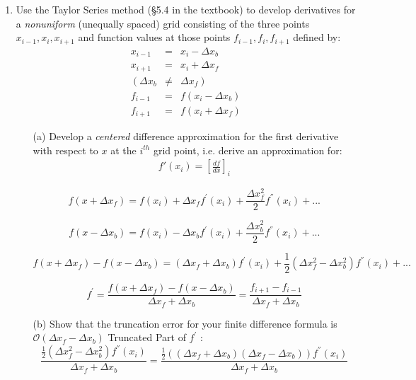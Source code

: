 \documentclass{article}
\begin{document}
\begin{enumerate}
  \item Use the Taylor Series method (\S 5.4 in the textbook) to develop derivatives for a \emph{nonuniform} (unequally spaced) grid consisting of the three points $x_{i-1},x_i,x_{i+1}$ and function values at those points $f_{i-1},f_i,f_{i+1}$ defined by:
    \begin{eqnarray}
      x_{i-1} &=& x_i - \Delta x_b \\
      x_{i+1} &=& x_i + \Delta x_f \\
      \left( \Delta x_b \right. &\ne& \left. \Delta x_f \right) \\
      f_{i-1} &=& f(x_i - \Delta x_b) \\ 
      f_{i+1} &=& f(x_i + \Delta x_f)     
    \end{eqnarray}
    
    \bigbreak
    
    \begin{itemize}
      \item[(a)]  Develop a \emph{centered} difference approximation for the first derivative with respect to $x$ at the $i^{th}$ grid point, i.e. derive an approximation for:
      \begin{eqnarray}
      f'(x_i) = \left[ \frac{d f}{d x} \right]_i
      \end{eqnarray}
  
    $$f(x + \Delta x_f) = f(x_i) + \Delta x_f f^{'}(x_i) + \frac{\Delta x^{2}_f}{2} f^{''} (x_i) + ... $$
    
    $$f(x - \Delta x_b) = f(x_i) - \Delta x_b f^{'}(x_i) + \frac{\Delta x^{2}_b}{2} f^{''} (x_i) + ... $$
    
    $$f(x + \Delta x_f) - f(x - \Delta x_b) = (\Delta x_f + \Delta x_b)f^{'}(x_i) + \frac{1}{2} (\Delta x^{2}_f - \Delta x^{2}_b)f^{''}(x_i) + ...$$
    
    $$\boxed{f^{'} = \frac{f(x + \Delta x_f) - f(x - \Delta x_b)}{\Delta x_f + \Delta x_b} = \frac{f_{i+1} - f_{i-1}}{\Delta x_f + \Delta x_b}}$$
    
    \bigskip
    \bigskip
    
    \item[(b)]  Show that the truncation error for your finite difference formula is $\mathcal{O}(\Delta x_f - \Delta x_b)$
    Truncated Part of $f^{'}$ :
    $$\frac{\frac{1}{2} (\Delta x^{2}_f - \Delta x^{2}_b)f^{''} (x_i)}{\Delta x_f + \Delta x_b} = \frac{\frac{1}{2} ((\Delta x_f + \Delta x_b)(\Delta x_f - \Delta x_b))f^{''} (x_i)}{\Delta x_f + \Delta x_b}$$
    

\end{itemize}
\end{enumerate}
\end{document}
